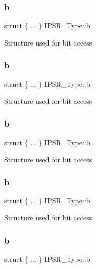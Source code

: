 \subsubsection{\texorpdfstring{b}{b}\hspace{0.1cm}{\footnotesize\ttfamily [2/12]}}
{\footnotesize\ttfamily struct \{ ... \}   I\+P\+S\+R\+\_\+\+Type\+::b}

Structure used for bit access \mbox{\label{union_i_p_s_r___type_a89147e8b140681f9bcd5c65ca16b93ae}} 
\subsubsection{\texorpdfstring{b}{b}\hspace{0.1cm}{\footnotesize\ttfamily [3/12]}}
{\footnotesize\ttfamily struct \{ ... \}   I\+P\+S\+R\+\_\+\+Type\+::b}

Structure used for bit access \mbox{\label{union_i_p_s_r___type_a4f5b60c40c6b98068f74da39a8d501ca}} 
\subsubsection{\texorpdfstring{b}{b}\hspace{0.1cm}{\footnotesize\ttfamily [4/12]}}
{\footnotesize\ttfamily struct \{ ... \}   I\+P\+S\+R\+\_\+\+Type\+::b}

Structure used for bit access \mbox{\label{union_i_p_s_r___type_a9842dbfff529511e0c7fa1968673b5b7}} 
\subsubsection{\texorpdfstring{b}{b}\hspace{0.1cm}{\footnotesize\ttfamily [5/12]}}
{\footnotesize\ttfamily struct \{ ... \}   I\+P\+S\+R\+\_\+\+Type\+::b}

Structure used for bit access \mbox{\label{union_i_p_s_r___type_aa9916267c9436e800b931582da201003}} 
\subsubsection{\texorpdfstring{b}{b}\hspace{0.1cm}{\footnotesize\ttfamily [6/12]}}
{\footnotesize\ttfamily struct \{ ... \}   I\+P\+S\+R\+\_\+\+Type\+::b}

